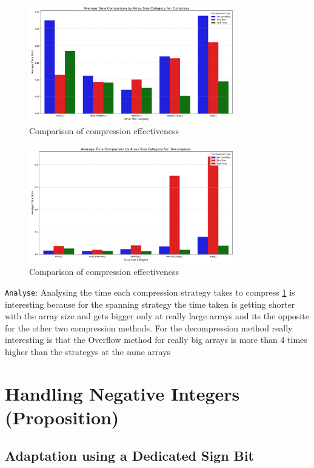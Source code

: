 \documentclass[11pt, a4paper]{article}
\begin{document}
	\begin{figure}[H]%
		\centering
		\includegraphics[width=0.8\textwidth]{Grafics/Compare/ComparingCompressTime.png}
		\caption{Comparison of compression effectiveness}
		\label{fig:33}
		\end{figure}
	\begin{figure}[H]%
		\centering
		\includegraphics[width=0.8\textwidth]{Grafics/Compare/ComparingDecompressTime.png}
		\caption{Comparison of compression effectiveness}
		\label{fig:34}
	\end{figure}
	\texttt{Analyse}: Analysing the time each compression strategy takes to compress \ref{fig:33} is interesting because for the spanning strategy the time taken is getting shorter with the array size and gets bigger only at really large arrays and its the opposite for the other two compression methods. For the decompression method really interesting is that the Overflow method for really big arrays is more than 4 times higher than the strategys at the same arrays
	
	\section{Handling Negative Integers (Proposition)}
	
	\subsection{Adaptation using a Dedicated Sign Bit}
	
\end{document}
